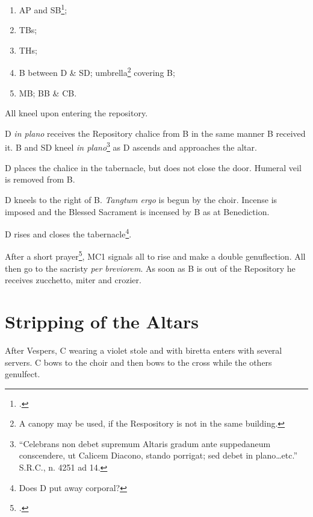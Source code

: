 {\begin{enumerate}
    \item AP and SB\footcite[``If the width of the aisle permits, the assistant
        priest may walk at the right of the bishop, slighlty in advance of the
        assistant deacon, and the staff-bearer may walk between the
        thurifers.''][footnote 2]{stehle};

    \item TBs;

    \item THs;

    \item B between D \& SD; umbrella\footnote{A canopy may be used, if the
        Respository is not in the same building.} covering B;

    \item MB; BB \& CB.

\end{enumerate}

\rubric All kneel upon entering the repository.

\rubric D \textit{in plano} receives the Repository chalice from B in the same
manner B received it. B and SD kneel \textit{in plano}\footnote{``Celebrans non
debet supremum Altaris gradum ante suppedaneum conscendere, ut Calicem Diacono,
stando porrigat; sed debet in plano\dots etc.'' S.R.C., n. 4251 ad 14.} as D
ascends and approaches the altar.

\rubric D places the chalice in the tabernacle, but does not close the door.
Humeral veil is removed from B.

\rubric D kneels to the right of B. \textit{Tangtum ergo} is begun by the
choir. Incense is imposed and the Blessed Sacrament is incensed by B as at
Benediction.

\rubric D rises and closes the tabernacle\footnote{Does D put away corporal?}.

\rubric After a short prayer\footcite[B is instructed to give a blessing at
this point with miter and crozier. Is this reserved to the Ordinary?][p.
192]{stehle}, MC1 signals all to rise and make a double genuflection. All then
go to the sacristy \textit{per breviorem}. As soon as B is out of the
Repository he receives zucchetto, miter and crozier.

\section{Stripping of the Altars}

\rubric After Vespers, C wearing a violet stole and with biretta enters with
several servers. C bows to the choir and then bows to the cross while the
others genulfect.

}
